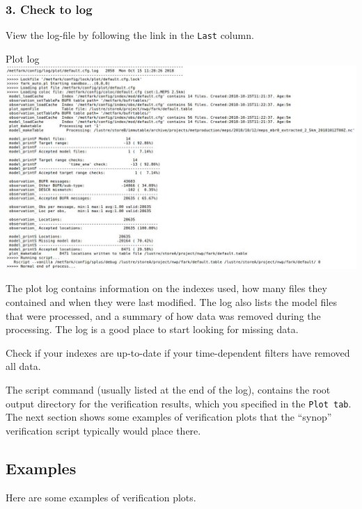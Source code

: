\documentclass[letterpaper,10pt,twoside,twocolumn,openany]{book}
\begin{document}
{\subsubsection{3. Check to log}
View the log-file by following the link in the \lstinline!Last! column. 
\begin{paperbox}{Plot log}
  \includegraphics[width=\columnwidth]{plotlog.jpg}
\end{paperbox}
The plot log contains information on the indexes used, how many files they contained and when they were last modified.
The log also lists the model files that were processed, and a summary of how data was removed during the processing. 
The log is a good place to start looking for missing data.
\begin{quotebox}
  Check if your indexes are up-to-date if your time-dependent filters have removed all data.
\end{quotebox}

The script command (usually listed at the end of the log), contains the root output directory for the verification results, which you specified in the \lstinline!Plot tab!. The next section shows some examples of verification plots that the ``synop'' verification script typically would place there.

\subsection{Examples}
Here are some examples of verification plots.

}
\end{document}
